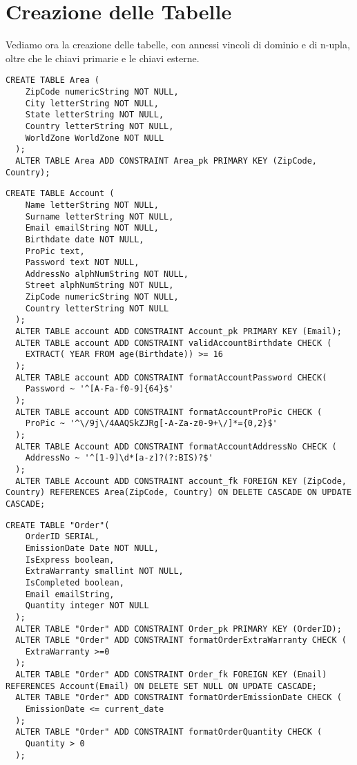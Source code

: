 \section{Creazione delle Tabelle}

Vediamo ora la creazione delle tabelle, con annessi vincoli di dominio e di n-upla, oltre che le chiavi primarie e le chiavi esterne.

\begin{lstlisting}[caption={Creazione della tabella \textbf{Area}}]
  CREATE TABLE Area (
    ZipCode numericString NOT NULL,
    City letterString NOT NULL,
    State letterString NOT NULL,
    Country letterString NOT NULL,
    WorldZone WorldZone NOT NULL
  );
  ALTER TABLE Area ADD CONSTRAINT Area_pk PRIMARY KEY (ZipCode, Country);
\end{lstlisting}

\begin{lstlisting}[caption={Creazione della tabella \textbf{Account}}]
  CREATE TABLE Account (
    Name letterString NOT NULL,
    Surname letterString NOT NULL,
    Email emailString NOT NULL,
    Birthdate date NOT NULL,
    ProPic text,
    Password text NOT NULL,
    AddressNo alphNumString NOT NULL,
    Street alphNumString NOT NULL,
    ZipCode numericString NOT NULL,
    Country letterString NOT NULL
  );
  ALTER TABLE account ADD CONSTRAINT Account_pk PRIMARY KEY (Email);
  ALTER TABLE account ADD CONSTRAINT validAccountBirthdate CHECK (
    EXTRACT( YEAR FROM age(Birthdate)) >= 16 
  );
  ALTER TABLE account ADD CONSTRAINT formatAccountPassword CHECK(
    Password ~ '^[A-Fa-f0-9]{64}$'
  );
  ALTER TABLE account ADD CONSTRAINT formatAccountProPic CHECK (
    ProPic ~ '^\/9j\/4AAQSkZJRg[-A-Za-z0-9+\/]*={0,2}$'
  );
  ALTER TABLE Account ADD CONSTRAINT formatAccountAddressNo CHECK (
    AddressNo ~ '^[1-9]\d*[a-z]?(?:BIS)?$'
  );
  ALTER TABLE Account ADD CONSTRAINT account_fk FOREIGN KEY (ZipCode, Country) REFERENCES Area(ZipCode, Country) ON DELETE CASCADE ON UPDATE CASCADE;
\end{lstlisting}

\newpage
\begin{lstlisting}[caption={Creazione della tabella \textbf{Order}}]
  CREATE TABLE "Order"(
    OrderID SERIAL, 
    EmissionDate Date NOT NULL,
    IsExpress boolean,
    ExtraWarranty smallint NOT NULL,
    IsCompleted boolean,
    Email emailString,
    Quantity integer NOT NULL
  );
  ALTER TABLE "Order" ADD CONSTRAINT Order_pk PRIMARY KEY (OrderID);
  ALTER TABLE "Order" ADD CONSTRAINT formatOrderExtraWarranty CHECK (
    ExtraWarranty >=0
  );
  ALTER TABLE "Order" ADD CONSTRAINT Order_fk FOREIGN KEY (Email) REFERENCES Account(Email) ON DELETE SET NULL ON UPDATE CASCADE;
  ALTER TABLE "Order" ADD CONSTRAINT formatOrderEmissionDate CHECK (
    EmissionDate <= current_date
  );
  ALTER TABLE "Order" ADD CONSTRAINT formatOrderQuantity CHECK (
    Quantity > 0
  );
\end{lstlisting}

